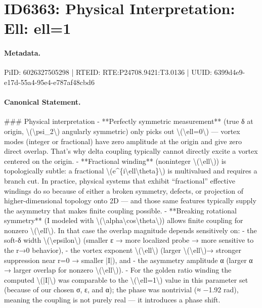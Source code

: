 \section*{ID6363: Physical Interpretation: Ell: ell=1}
\paragraph{Metadata.}
PiID: 6026327505298 | RTEID: RTE:P24708.9421:T3.0136 | UUID: 6399d4e9-e17d-55a4-95e4-e787af48cbd6

\paragraph{Canonical Statement.}
\#\#\# Physical interpretation - **Perfectly symmetric measurement** (true δ at origin, \textbackslash{}(\textbackslash{}psi\_2\textbackslash{}) angularly symmetric) only picks out \textbackslash{}(\textbackslash{}ell=0\textbackslash{}) — vortex modes (integer or fractional) have zero amplitude at the origin and give zero direct overlap. That’s why delta coupling typically cannot directly excite a vortex centered on the origin. - **Fractional winding** (noninteger \textbackslash{}(\textbackslash{}ell\textbackslash{})) is topologically subtle: a fractional \textbackslash{}(e\textasciicircum{}\{i\textbackslash{}ell\textbackslash{}theta\}\textbackslash{}) is multivalued and requires a branch cut. In practice, physical systems that exhibit “fractional” effective windings do so because of either a broken symmetry, defects, or projection of higher-dimensional topology onto 2D — and those same features typically supply the asymmetry that makes finite coupling possible. - **Breaking rotational symmetry** (I modeled with \textbackslash{}(\textbackslash{}alpha\textbackslash{}cos\textbackslash{}theta\textbackslash{})) allows finite coupling for nonzero \textbackslash{}(\textbackslash{}ell\textbackslash{}). In that case the overlap magnitude depends sensitively on: - the soft-δ width \textbackslash{}(\textbackslash{}epsilon\textbackslash{}) (smaller ε → more localized probe → more sensitive to the r→0 behavior), - the vortex exponent \textbackslash{}(\textbackslash{}ell\textbackslash{}) (larger \textbackslash{}(\textbackslash{}ell\textbackslash{})→ stronger suppression near r=0 → smaller |I|), and - the asymmetry amplitude α (larger α → larger overlap for nonzero \textbackslash{}(\textbackslash{}ell\textbackslash{})). - For the golden ratio winding the computed \textbackslash{}(|I|\textbackslash{}) was comparable to the \textbackslash{}(\textbackslash{}ell=1\textbackslash{}) value in this parameter set (because of our chosen σ, ε, and α); the phase was nontrivial (≈ −1.92 rad), meaning the coupling is not purely real — it introduces a phase shift.

